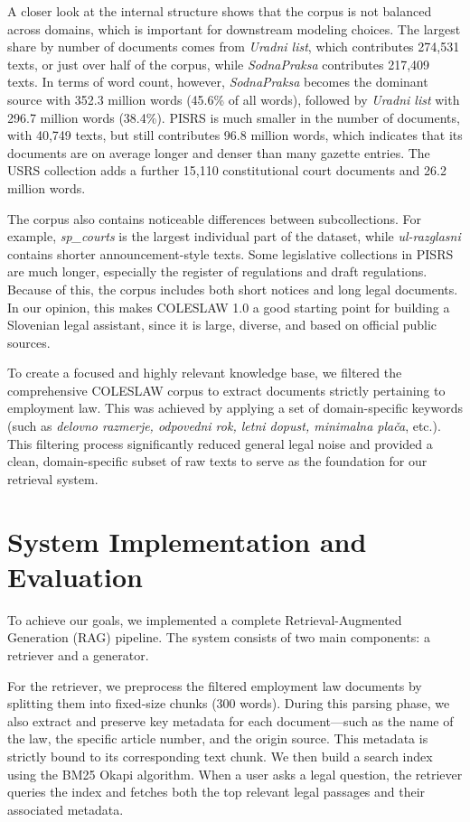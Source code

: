 \documentclass[fleqn,moreauthors,10pt]{ds_report}
\begin{document}
A closer look at the internal structure shows that the corpus is not balanced across domains, which
is important for downstream modeling choices. The largest share by number of documents comes from
\textit{Uradni list}, which contributes 274,531 texts, or just over half of the corpus, while
\textit{SodnaPraksa} contributes 217,409 texts. In terms of word count, however,
\textit{SodnaPraksa} becomes the dominant source with 352.3 million words (45.6\% of all words),
followed by \textit{Uradni list} with 296.7 million words (38.4\%). PISRS is much smaller in the
number of documents, with 40,749 texts, but still contributes 96.8 million words, which indicates
that its documents are on average longer and denser than many gazette entries. The USRS collection
adds a further 15,110 constitutional court documents and 26.2 million words.

The corpus also contains noticeable differences between subcollections. For example,
\textit{sp\_courts} is the largest individual part of the dataset, while \textit{ul-razglasni}
contains shorter announcement-style texts. Some legislative collections in PISRS are much longer,
especially the register of regulations and draft regulations. Because of this, the corpus includes
both short notices and long legal documents. In our opinion, this makes COLESLAW 1.0 a good
starting point for building a Slovenian legal assistant, since it is large, diverse, and based on
official public sources.

To create a focused and highly relevant knowledge base, we filtered the comprehensive COLESLAW corpus to extract documents strictly pertaining to employment law.
This was achieved by applying a set of domain-specific keywords (such as \textit{delovno razmerje, odpovedni rok, letni dopust, minimalna plača}, etc.).
This filtering process significantly reduced general legal noise and provided a clean,
domain-specific subset of raw texts to serve as the foundation for our retrieval system.

\section*{System Implementation and Evaluation}

To achieve our goals, we implemented a complete Retrieval-Augmented Generation (RAG) pipeline. The system consists of two main components: a retriever and a generator.

For the retriever, we preprocess the filtered employment law documents by splitting them into fixed-size chunks (300 words).
During this parsing phase, we also extract and preserve key metadata for each document---such as the name of the law, the specific article number, and the origin source.
This metadata is strictly bound to its corresponding text chunk. We then build a search index using the BM25 Okapi algorithm.
When a user asks a legal question, the retriever queries the index and fetches both the top relevant legal passages and their associated metadata.
\end{document}
